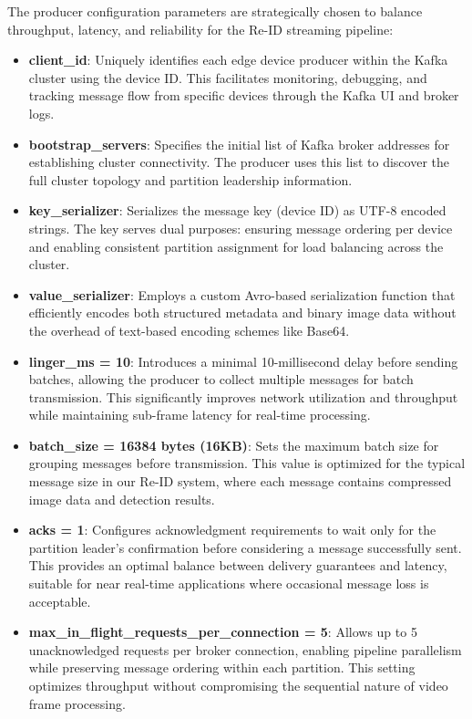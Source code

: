 \documentclass[../main.tex]{subfiles}
\begin{document}
The producer configuration parameters are strategically chosen to balance throughput, latency, and reliability for the Re-ID streaming pipeline:

\begin{itemize}
    \item \textbf{client\_id}: Uniquely identifies each edge device producer within the Kafka cluster using the device ID. This facilitates monitoring, debugging, and tracking message flow from specific devices through the Kafka UI and broker logs.
    
    \item \textbf{bootstrap\_servers}: Specifies the initial list of Kafka broker addresses for establishing cluster connectivity. The producer uses this list to discover the full cluster topology and partition leadership information.
    
    \item \textbf{key\_serializer}: Serializes the message key (device ID) as UTF-8 encoded strings. The key serves dual purposes: ensuring message ordering per device and enabling consistent partition assignment for load balancing across the cluster.
    
    \item \textbf{value\_serializer}: Employs a custom Avro-based serialization function that efficiently encodes both structured metadata and binary image data without the overhead of text-based encoding schemes like Base64.
    
    \item \textbf{linger\_ms = 10}: Introduces a minimal 10-millisecond delay before sending batches, allowing the producer to collect multiple messages for batch transmission. This significantly improves network utilization and throughput while maintaining sub-frame latency for real-time processing.
    
    \item \textbf{batch\_size = 16384 bytes (16KB)}: Sets the maximum batch size for grouping messages before transmission. This value is optimized for the typical message size in our Re-ID system, where each message contains compressed image data and detection results.
    
    \item \textbf{acks = 1}: Configures acknowledgment requirements to wait only for the partition leader's confirmation before considering a message successfully sent. This provides an optimal balance between delivery guarantees and latency, suitable for near real-time applications where occasional message loss is acceptable.
    
    \item \textbf{max\_in\_flight\_requests\_per\_connection = 5}: Allows up to 5 unacknowledged requests per broker connection, enabling pipeline parallelism while preserving message ordering within each partition. This setting optimizes throughput without compromising the sequential nature of video frame processing.
\end{itemize}
\end{document}
